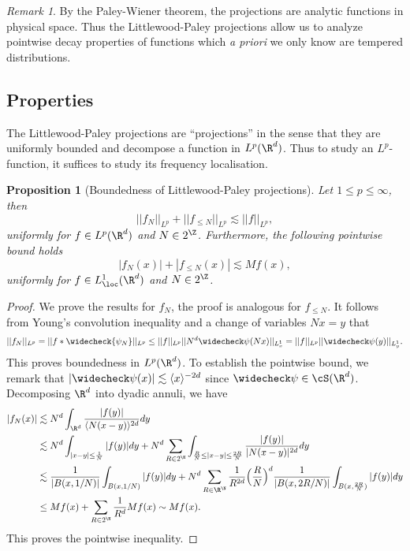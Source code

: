 \documentclass[reqno]{amsart}
\newtheorem{proposition}[theorem]{Proposition}
\theoremstyle{definition}
\theoremstyle{remark}
\newtheorem*{remark}{Remark}
\begin{document}
\begin{remark}
	By the Paley-Wiener theorem, the projections are analytic functions in physical space. Thus the Littlewood-Paley projections allow us to analyze pointwise decay properties of functions which \textit{a priori} we only know are tempered distributions. 
\end{remark}


\subsection{Properties}

The Littlewood-Paley projections are ``projections'' in the sense that they are uniformly bounded and decompose a function in $L^p (\R^d)$. Thus to study an $L^p$-function, it suffices to study its frequency localisation. 

\begin{proposition}[Boundedness of Littlewood-Paley projections]
	Let $1 \leq p \leq \infty$, then 
		\[||f_N||_{L^p} + ||f_{\leq N} ||_{L^p} \lesssim ||f||_{L^p},\]	
	uniformly for $f \in L^p (\R^d)$ and $N \in 2^\Z$. Furthermore, the following pointwise bound holds
		\[|f_N (x)| + | f_{\leq N} (x)| \lesssim M f(x),\]
	uniformly for $f \in L^1_{\loc} (\R^d)$ and $N \in 2^\Z$. \label{prop:bounded}
\end{proposition}

\begin{proof}
	We prove the results for $f_N$, the proof is analogous for $f_{\leq N}$. It follows from Young's convolution inequality and a change of variables $Nx = y$ that 
		\[ ||f_N||_{L^p} = || f * \widecheck{\psi_N} ||_{L^p} \leq ||f||_{L^p} ||N^d \widecheck \psi (Nx)||_{L^1_x} = ||f||_{L^p} ||\widecheck \psi (y) ||_{L^1_y}. \] 
	This proves boundedness in $L^p (\R^d)$. To establish the pointwise bound, we remark that $|\widecheck \psi (x)| \lesssim \langle x \rangle^{-2d}$ since $\widecheck \psi \in \cS (\R^d)$. Decomposing $\R^d$ into dyadic annuli, we have
				\begin{align*}
					|f_N (x)|
						&\lesssim N^d \int_{\R^d} \frac{|f(y)|}{\langle N(x - y) \rangle^{2d}} dy \\
						&\lesssim N^d \int_{|x - y| \leq \frac1N} |f(y)| dy + N^d \sum_{R \in 2^\N}  \int_{\frac{R}{N} \leq |x - y| \leq \frac{2R}{N}} \frac{|f(y)|}{|N (x - y)|^{2d}} dy \\
						&\lesssim \frac{1}{|B(x, 1/N)|} \int_{B(x, 1/N)} |f(y)| dy + N^d \sum_{R \in \R^\N} \frac{1}{R^{2d}} \Big(\frac{R}{N}\Big)^d \frac{1}{|B(x, 2R/N)|} \int_{B(x, \frac{2R}{N})} |f(y)| dy \\
						&\leq Mf (x) + \sum_{R \in 2^\N} \frac{1}{R^d} M f(x) \sim Mf(x).
				\end{align*}
	This proves the pointwise inequality. 
\end{proof}
\end{document}
